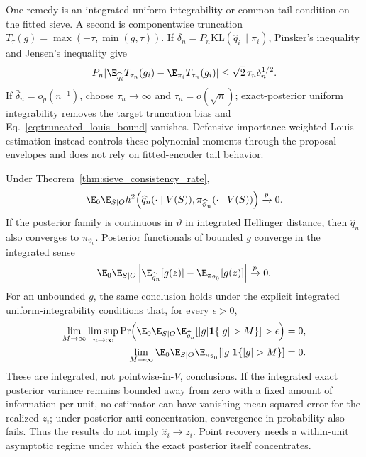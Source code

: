 One remedy is an integrated uniform-integrability or common tail condition on
the fitted sieve.  A second is componentwise truncation
$T_\tau(g)=\max(-\tau,\min(g,\tau))$.  If
$\bar\delta_n=P_n\mathrm{KL}(\widehat q_i\|\pi_i)$, Pinsker's inequality and
Jensen's inequality give
\begin{equation}
 P_n|\E_{\widehat q_i}T_{\tau_n}(g_i)
       -\E_{\pi_i}T_{\tau_n}(g_i)|
 \leq\sqrt2\,\tau_n\bar\delta_n^{1/2}.
 \label{eq:truncated_louis_bound}
\end{equation}
If $\bar\delta_n=o_p(n^{-1})$, choose
$\tau_n\to\infty$ and $\tau_n=o(\sqrt n)$; exact-posterior uniform
integrability removes the target truncation bias and
Eq.~\eqref{eq:truncated_louis_bound} vanishes.  Defensive importance-weighted
Louis estimation instead controls these polynomial moments through the
proposal envelopes and does not rely on fitted-encoder tail behavior.

\begin{proposition}
\label{prop:posterior_recovery}
Under Theorem~\ref{thm:sieve_consistency_rate},
\[
 \E_0\E_{S\mid O} h^2\!\left(\widehat q_n(\cdot\mid V(S)),
 \pi_{\widehat\vartheta_n}(\cdot\mid V(S))\right)\xrightarrow{p}0.
\]
If the posterior family is continuous in $\vartheta$ in integrated Hellinger
distance, then $\widehat q_n$ also converges to $\pi_{\vartheta_0}$.  Posterior
functionals of bounded $g$ converge in the integrated sense
\[
 \E_0\E_{S\mid O}\left|
 \E_{\widehat q_n}[g(z)]-\E_{\pi_{\vartheta_0}}[g(z)]\right|
 \xrightarrow{p}0.
\]
For an unbounded $g$, the same conclusion holds under the explicit integrated
uniform-integrability conditions that, for every $\epsilon>0$,
\begin{align*}
 \lim_{M\to\infty}\limsup_{n\to\infty}
 \Pr\!\left(\E_0\E_{S\mid O}
 \E_{\widehat q_n}[|g|\mathbf 1\{|g|>M\}]>\epsilon\right)&=0,\\
 \lim_{M\to\infty}\E_0\E_{S\mid O}
 \E_{\pi_{\vartheta_0}}[|g|\mathbf 1\{|g|>M\}]&=0.
\end{align*}
These are integrated, not pointwise-in-$V$, conclusions.  If
the integrated exact posterior variance remains bounded away from zero with a
fixed amount of information per unit, no estimator can have vanishing
mean-squared error for the realized $z_i$; under posterior
anti-concentration, convergence in probability also fails.  Thus the results
do not imply $\widehat z_i\to z_i$.  Point recovery needs a within-unit
asymptotic regime under which the exact posterior itself concentrates.
\end{proposition}

